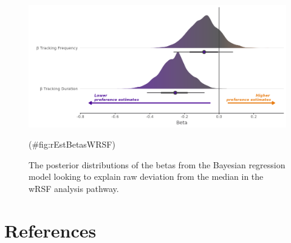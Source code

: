 \documentclass[10pt,a4paper]{article}
\begin{document}
\begin{figure}
\includegraphics[width=1\linewidth]{../figures/wrsf_rEstwrsf_effectsPlot} \caption{The posterior distributions of the betas from the Bayesian regression model looking to explain raw deviation from the median in the wRSF analysis pathway.}(\#fig:rEstBetasWRSF)
\end{figure}

\clearpage

\section*{References}\label{references}
\end{document}
